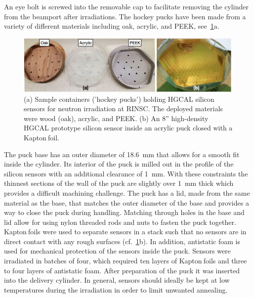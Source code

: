 An eye bolt is screwed into the removable cap to facilitate removing the cylinder from the beamport after irradiations.\newline
The hockey pucks have been made from a variety of different materials including oak, acrylic, and PEEK, see~\ref{fig:Pucks_Arrayed}a. 
\begin{figure}[!hbt]
  \begin{center}
    \includegraphics[width=0.99\textwidth]{figures/figures_edited_002.jpeg}
    \caption{(a) Sample containers ('hockey pucks') holding HGCAL silicon sensors for neutron irradiation at RINSC. 
    The deployed materials were wood (oak), acrylic, and PEEK.
    (b) An 8'' high-density HGCAL prototype silicon sensor inside an acrylic puck closed with a Kapton\texttrademark$~$foil.}
    \label{fig:Pucks_Arrayed}
  \end{center}
\end{figure}
The puck base has an outer diameter of \SI{18.6}{\milli\metre} that allows for a smooth fit inside the cylinder. 
Its interior of the puck is milled out in the profile of the silicon sensors with an additional clearance of \SI{1}{\milli\metre}. 
With these constraints the thinnest sections of the wall of the puck are slightly over \SI{1}{\milli\metre} thick which provides a difficult machining challenge.
The puck has a lid, made from the same material as the base, that matches the outer diameter of the base and provides a way to close the puck during handling.
Matching through holes in the base and lid allow for using nylon threaded rods and nuts to fasten the puck together. \newline
Kapton\texttrademark$~$foils were used to separate sensors in a stack such that no sensors are in direct contact with any rough surfaces (cf.~\ref{fig:Pucks_Arrayed}b).
In addition, antistatic foam is used for mechanical protection of the sensors inside the puck.
Sensors were irradiated in batches of four, which required ten layers of Kapton\texttrademark$~$foils and three to four layers of antistatic foam. 
After preparation of the puck it was inserted into the delivery cylinder.
In general, sensors should ideally be kept at low temperatures during the irradiation in order to limit unwanted annealing.
